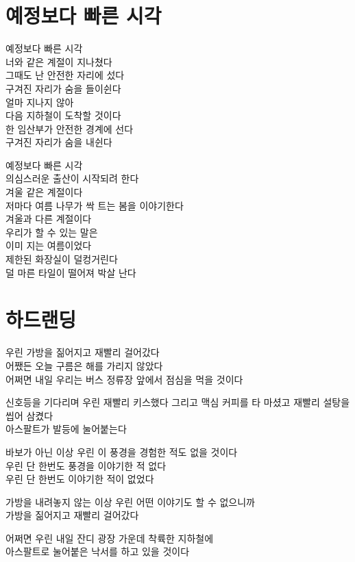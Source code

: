 \documentclass[12pt, b6paper, openany]{memoir}
\newenvironment{lyric}{\setlength{\parindent}{0pt}}{}
\begin{document}
\begin{lyric}
\hypertarget{uxc608uxc815uxbcf4uxb2e4-uxbe60uxb978-uxc2dcuxac01}{%
\chapter{예정보다 빠른 시각}\label{uxc608uxc815uxbcf4uxb2e4-uxbe60uxb978-uxc2dcuxac01}}

예정보다 빠른 시각\\
너와 같은 계절이 지나쳤다\\
그때도 난 안전한 자리에 섰다\\
구겨진 자리가 숨을 들이쉰다\\
얼마 지나지 않아\\
다음 지하철이 도착할 것이다\\
한 임산부가 안전한 경계에 선다\\
구겨진 자리가 숨을 내쉰다

예정보다 빠른 시각\\
의심스러운 출산이 시작되려 한다\\
겨울 같은 계절이다\\
저마다 여름 나무가 싹 트는 봄을 이야기한다\\
겨울과 다른 계절이다\\
우리가 할 수 있는 말은\\
이미 지는 여름이었다\\
제한된 화장실이 덜컹거린다\\
덜 마른 타일이 떨어져 박살 난다
\end{lyric}

\begin{lyric}
\hypertarget{uxd558uxb4dcuxb79cuxb529}{%
\chapter{하드랜딩}\label{uxd558uxb4dcuxb79cuxb529}}

우린 가방을 짊어지고 재빨리 걸어갔다\\
어쨌든 오늘 구름은 해를 가리지 않았다\\
어쩌면 내일 우리는 버스 정류장 앞에서 점심을 먹을 것이다

신호등을 기다리며 우린 재빨리 키스했다 그리고 맥심 커피를 타 마셨고 재빨리 설탕을 씹어 삼켰다\\
아스팔트가 발등에 눌어붙는다

바보가 아닌 이상 우린 이 풍경을 경험한 적도 없을 것이다\\
우린 단 한번도 풍경을 이야기한 적 없다\\
우린 단 한번도 이야기한 적이 없었다

가방을 내려놓지 않는 이상 우린 어떤 이야기도 할 수 없으니까\\
가방을 짊어지고 재빨리 걸어갔다

어쩌면 우린 내일 잔디 광장 가운데 착륙한 지하철에\\
아스팔트로 눌어붙은 낙서를 하고 있을 것이다
\end{lyric}
\end{document}
